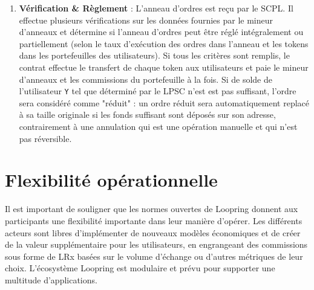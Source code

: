\documentclass[UTF8,nofonts]{article}
\makeatletter
\newenvironment{figurehere}
 {\def\@captype{figure}}
 {}
\makeatother
\begin{document}
\begin{multicols}{2}
\begin{enumerate}
\item \textbf{Vérification \& Règlement} : L'anneau d'ordres est reçu par le SCPL. Il effectue plusieurs vérifications sur les données fournies par le mineur d'anneaux et détermine si l'anneau d'ordres peut être réglé intégralement ou partiellement (selon le taux d'exécution des ordres dans l'anneau et les tokens dans les portefeuilles des utilisateurs). Si tous les critères sont remplis, le contrat effectue le transfert de chaque token aux utilisateurs et paie le mineur d'anneaux et les commissions du portefeuille à la fois. Si de solde de l'utilisateur \verb|Y| tel que déterminé par le LPSC n'est est pas suffisant, l'ordre sera considéré comme "réduit" : un ordre réduit sera automatiquement replacé à sa taille originale si les fonds suffisant sont déposés sur son adresse, contrairement à une annulation qui est une opération manuelle et qui n'est pas réversible.


\end{enumerate}





%
%
%

\section{Flexibilité opérationnelle\label{sec:business_model}}
Il est important de souligner que les normes ouvertes de Loopring donnent aux participants une flexibilité importante dans leur manière d'opérer. Les différents acteurs sont libres d'implémenter de nouveaux modèles économiques et de créer de la valeur supplémentaire pour les utilisateurs, en engrangeant des commissions sous forme de LRx basées sur le volume d'échange ou d'autres métriques de leur choix. L'écosystème Loopring est modulaire et prévu pour supporter une multitude d'applications.



\end{multicols}
\end{document}
